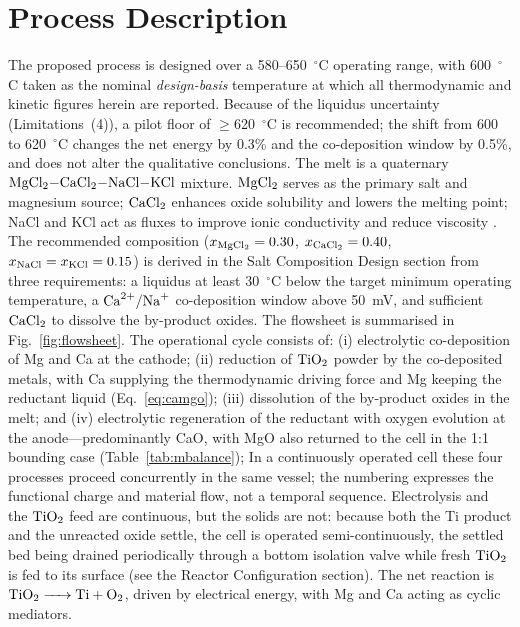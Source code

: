 \documentclass[pdflatex,sn-basic,Numbered]{sn-jnl}
\begin{document}
\section{Process Description}\label{sec:process}

The proposed process is designed over a 580--650~$^{\circ}$C operating range, with 600~$^{\circ}$C taken as the nominal \emph{design-basis} temperature at which all thermodynamic and kinetic figures herein are reported. Because of the liquidus uncertainty (Limitations~(4)), a pilot floor of $\geq$620~$^{\circ}$C is recommended; the shift from 600 to 620~$^{\circ}$C changes the net energy by 0.3\% and the co-deposition window by 0.5\%, and does not alter the qualitative conclusions. The melt is a quaternary $\ce{MgCl2-CaCl2-NaCl-KCl}$ mixture. $\ce{MgCl2}$ serves as the primary salt and magnesium source; $\ce{CaCl2}$ enhances oxide solubility and lowers the melting point; NaCl and KCl act as fluxes to improve ionic conductivity and reduce viscosity \cite{sato1999}. The recommended composition ($x_{\ce{MgCl2}} = 0.30$, $x_{\ce{CaCl2}} = 0.40$, $x_{\ce{NaCl}} = x_{\ce{KCl}} = 0.15$) is derived in the Salt Composition Design section from three requirements: a liquidus at least 30~$^{\circ}$C below the target minimum operating temperature, a $\ce{Ca^{2+}/Na+}$ co-deposition window above 50~mV, and sufficient $\ce{CaCl2}$ to dissolve the by-product oxides. The flowsheet is summarised in Fig.~\ref{fig:flowsheet}. The operational cycle consists of: (i) electrolytic co-deposition of Mg and Ca at the cathode; (ii) reduction of $\ce{TiO2}$ powder by the co-deposited metals, with Ca supplying the thermodynamic driving force and Mg keeping the reductant liquid (Eq.~\ref{eq:camgo}); (iii) dissolution of the by-product oxides in the melt; and (iv) electrolytic regeneration of the reductant with oxygen evolution at the anode---predominantly CaO, with MgO also returned to the cell in the 1:1 bounding case (Table~\ref{tab:mbalance}); In a continuously operated cell these four processes proceed concurrently in the same vessel; the numbering expresses the functional charge and material flow, not a temporal sequence. Electrolysis and the $\ce{TiO2}$ feed are continuous, but the solids are not: because both the Ti product and the unreacted oxide settle, the cell is operated semi-continuously, the settled bed being drained periodically through a bottom isolation valve while fresh $\ce{TiO2}$ is fed to its surface (see the Reactor Configuration section). The net reaction is $\ce{TiO2 -> Ti + O2}$, driven by electrical energy, with Mg and Ca acting as cyclic mediators.
\end{document}
